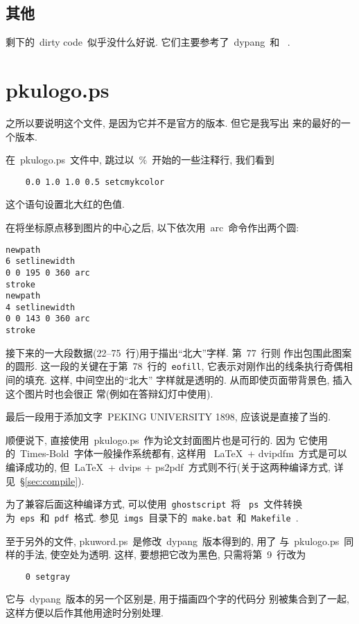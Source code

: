 \subsection{其他}
剩下的~dirty code~似乎没什么好说. 它们主要参考了~dypang\cite{dypang}~和
~\cite{texbook}.

\section{pkulogo.ps}

之所以要说明这个文件, 是因为它并不是官方的版本. 但它是我写出
来的最好的一个版本.

在~pkulogo.ps~文件中, 跳过以~\%~开始的一些注释行,
我们看到
\begin{verbatim}
    0.0 1.0 1.0 0.5 setcmykcolor
\end{verbatim}

这个语句设置北大红的色值\footnotemark.

在将坐标原点移到图片的中心之后, 以下依次用~arc~命令作出两个圆:
\begin{verbatim}
newpath
6 setlinewidth
0 0 195 0 360 arc
stroke
newpath
4 setlinewidth
0 0 143 0 360 arc
stroke
\end{verbatim}

接下来的一大段数据(22--75~行)用于描出``北大''字样. 第~77~行则
作出包围此图案的圆形. 这一段的关键在于第~78~行的~\verb|eofill|,
它表示对刚作出的线条执行奇偶相间的填充. 这样, 中间空出的``北大''
字样就是透明的. 从而即使页面带背景色, 插入这个图片时也会很正
常(例如在答辩幻灯中使用).

最后一段用于添加文字~PEKING UNIVERSITY 1898, 应该说是直接了当的.

顺便说下, 直接使用~pkulogo.ps~作为论文封面图片也是可行的. 因为
它使用的~Times-Bold~字体一般操作系统都有, 这样用
~\LaTeX\ + dvipdfm~方式是可以编译成功的,
但~\LaTeX\ + dvips + ps2pdf~方式则不行(关于这两种编译方式,
详见~\S\ref{sec:compile}).

为了兼容后面这种编译方式, 可以使用~\verb|ghostscript|~将~
\verb|ps|~文件转换为~\verb|eps|~和~\verb|pdf|~格式.
参见~\verb|imgs|~目录下的~\verb|make.bat|~和~\verb|Makefile|~.

至于另外的文件, pkuword.ps~是修改~dypang~版本得到的, 用了
与~pkulogo.ps~同样的手法, 使空处为透明. 这样, 要想把它改为黑色,
只需将第~9~行改为
\begin{verbatim}
    0 setgray
\end{verbatim}
它与~dypang~版本的另一个区别是, 用于描画四个字的代码分
别被集合到了一起, 这样方便以后作其他用途时分别处理.
